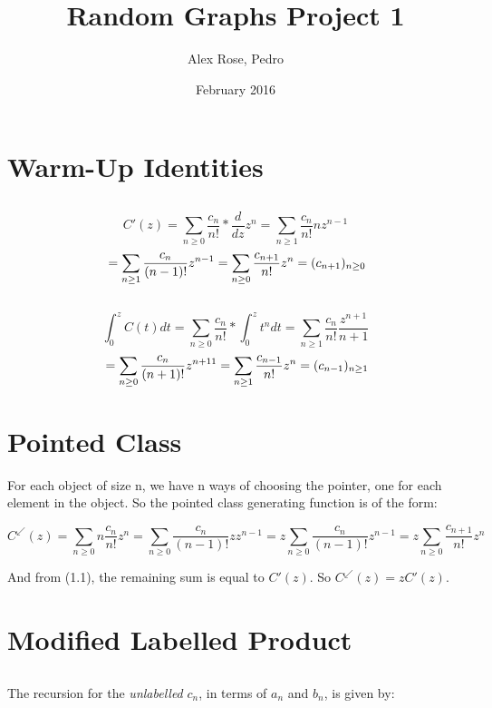 \documentclass{article}
\title{\vspace{-5.5cm}Random Graphs Project 1}
\author{Alex Rose, Pedro}
\date{February 2016}
\begin{document}
\maketitle

\section{Warm-Up Identities}

\subsection{}
$$ C'(z) =\sum_{n \ge 0} \frac{c_n}{n!} * \frac{d}{dz} z^n = \sum_{n \ge 1} \frac{c_n}{n!}nz^{n-1}$$ 
$$\newline = \sum_{n \ge 1} \frac{c_n}{(n-1)!}z^{n-1} = \sum_{n \ge 0} \frac{c_{n+1}}{n!}z^{n} = (c_{n+1})_{n \ge 0} $$

\subsection{}
$$ \int_{0}^{z} C(t) dt  =\sum_{n \ge 0} \frac{c_n}{n!} * \int_{0}^{z} t^n dt = \sum_{n \ge 1} \frac{c_n}{n!} \frac{z^{n+1}}{n+1}$$ 
$$\newline = \sum_{n \ge 0} \frac{c_n}{(n+1)!}z^{n+11} = \sum_{n \ge 1} \frac{c_{n-1}}{n!}z^{n} = (c_{n-1})_{n \ge 1} $$ 

\section{Pointed Class}
For each object of size n, we have n ways of choosing the pointer, one for each element in the object. So the pointed class generating function is of the form:

$$C^\swarrow(z) = \sum_{n \ge 0} n\frac{c_n}{n!}z^n = \sum_{n \ge 0} \frac{c_n}{(n-1)!}zz^{n-1} = z\sum_{n \ge 0} \frac{c_n}{(n-1)!}z^{n-1} = z\sum_{n \ge 0} \frac{c_{n+1}}{n!}z^{n}$$

And from (1.1), the remaining sum is equal to $C'(z)$. So $C^\swarrow(z) = zC'(z)$.


\section{Modified Labelled Product}

\subsection{}
The recursion for the \textit{unlabelled} $c_n$, in terms of $a_n$ and $b_n$, is given by:
\end{document}
